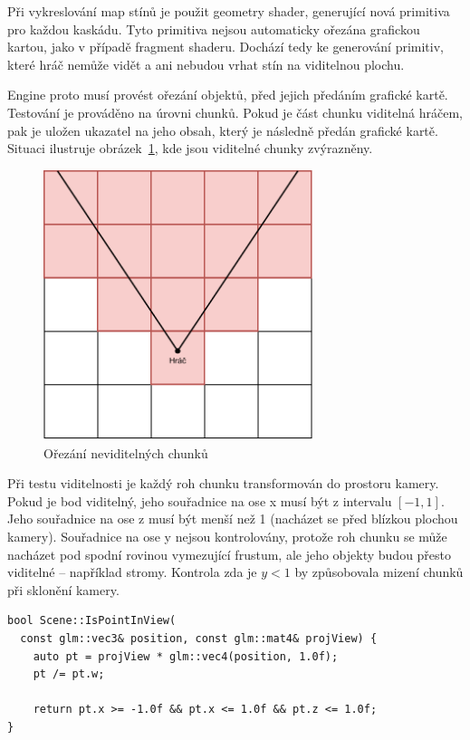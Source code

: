 \documentclass[thesis=M,czech]{FITthesis}[2019/12/23]
\begin{document}
Při vykreslování map stínů je použit geometry shader, generující nová primitiva pro každou kaskádu. Tyto primitiva nejsou automaticky ořezána grafickou kartou, jako v případě fragment shaderu. Dochází tedy ke generování primitiv, které hráč nemůže vidět a ani nebudou vrhat stín na viditelnou plochu.

Engine proto musí provést ořezání objektů, před jejich předáním grafické kartě. Testování je prováděno na úrovni chunků. Pokud je část chunku viditelná hráčem, pak je uložen ukazatel na jeho obsah, který je následně předán grafické kartě. Situaci ilustruje obrázek~\ref{fig:visible_chunks}, kde jsou viditelné chunky zvýrazněny.

\begin{figure}\centering
	\includegraphics[width=0.7\textwidth]{images/visible_chunks}
	\caption[Ořezání neviditelných chunků]{Ořezání neviditelných chunků}\label{fig:visible_chunks}
\end{figure}

Při testu viditelnosti je každý roh chunku transformován do prostoru kamery. Pokud je bod viditelný, jeho souřadnice na ose x musí být z intervalu $[-1, 1]$. Jeho souřadnice na ose z musí být menší než 1 (nacházet se před blízkou plochou kamery). Souřadnice na ose y nejsou kontrolovány, protože roh chunku se může nacházet pod spodní rovinou vymezující frustum, ale jeho objekty budou přesto viditelné -- například stromy. Kontrola zda je $y < 1$ by způsobovala mizení chunků při sklonění kamery.

\begin{verbatim}
bool Scene::IsPointInView(
  const glm::vec3& position, const glm::mat4& projView) {
    auto pt = projView * glm::vec4(position, 1.0f);
    pt /= pt.w;

    return pt.x >= -1.0f && pt.x <= 1.0f && pt.z <= 1.0f;
}
\end{verbatim}
\end{document}
